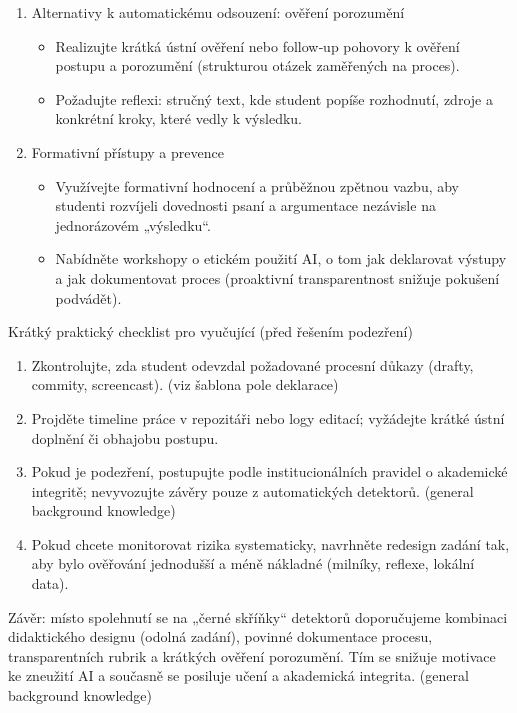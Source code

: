 \begin{enumerate}
  \item Alternativy k automatickému odsouzení: ověření porozumění
    \begin{itemize}
      \item Realizujte krátká ústní ověření nebo follow‑up pohovory k ověření postupu a porozumění (strukturou otázek zaměřených na proces).
      \item Požadujte reflexi: stručný text, kde student popíše rozhodnutí, zdroje a konkrétní kroky, které vedly k výsledku.
    \end{itemize}

  \item Formativní přístupy a prevence
    \begin{itemize}
      \item Využívejte formativní hodnocení a průběžnou zpětnou vazbu, aby studenti rozvíjeli dovednosti psaní a argumentace nezávisle na jednorázovém „výsledku“.
      \item Nabídněte workshopy o etickém použití AI, o tom jak deklarovat výstupy a jak dokumentovat proces (proaktivní transparentnost snižuje pokušení podvádět).
    \end{itemize}
\end{enumerate}

\bigskip

\noindent
Krátký praktický checklist pro vyučující (před řešením podezření)
\begin{enumerate}
  \item Zkontrolujte, zda student odevzdal požadované procesní důkazy (drafty, commity, screencast). (viz šablona pole deklarace)
  \item Projděte timeline práce v repozitáři nebo logy editací; vyžádejte krátké ústní doplnění či obhajobu postupu.
  \item Pokud je podezření, postupujte podle institucionálních pravidel o akademické integritě; nevyvozujte závěry pouze z automatických detektorů. (general background knowledge)
  \item Pokud chcete monitorovat rizika systematicky, navrhněte redesign zadání tak, aby bylo ověřování jednodušší a méně nákladné (milníky, reflexe, lokální data).
\end{enumerate}

\bigskip

\noindent
Závěr: místo spolehnutí se na „černé skříňky“ detektorů doporučujeme kombinaci didaktického designu (odolná zadání), povinné dokumentace procesu, transparentních rubrik a krátkých ověření porozumění. Tím se snižuje motivace ke zneužití AI a současně se posiluje učení a akademická integrita. (general background knowledge)